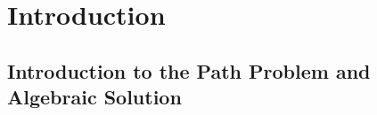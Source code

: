 \documentclass[a4paper,12pt,twoside,openright]{report}
\begin{document}
\pagestyle{empty}
\singlespacing

\onehalfspacing

\singlespacing


\setcounter{page}{0}
\pagestyle{plain}
\tableofcontents
\listoffigures
\listoftables

\onehalfspacing


\chapter{Introduction}
\setcounter{page}{1} 

%
%

\section{Introduction to the Path Problem and Algebraic Solution}
\end{document}
